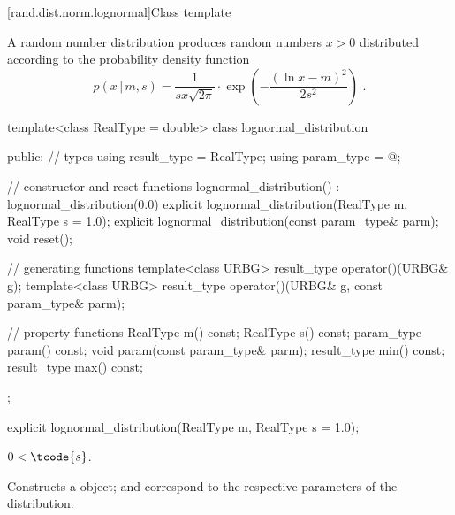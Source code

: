 
[rand.dist.norm.lognormal]{Class template }%
%
%

\pnum
A  random number distribution
produces random numbers $x > 0$
distributed according to
the probability density function%
%
%
\[ p(x\,|\,m,s) = \frac{1}{s x \sqrt{2 \pi}}
     \cdot \exp{\left(-\frac{(\ln{x} - m)^2}{2 s^2}\right)}
     \text{ .} \]

%
\begin{codeblock}
template<class RealType = double>
  class lognormal_distribution {
  public:
    // types
    using result_type = RealType;
    using param_type  = @\unspec@;

    // constructor and reset functions
    lognormal_distribution() : lognormal_distribution(0.0) {}
    explicit lognormal_distribution(RealType m, RealType s = 1.0);
    explicit lognormal_distribution(const param_type& parm);
    void reset();

    // generating functions
    template<class URBG>
      result_type operator()(URBG& g);
    template<class URBG>
      result_type operator()(URBG& g, const param_type& parm);

    // property functions
    RealType m() const;
    RealType s() const;
    param_type param() const;
    void param(const param_type& parm);
    result_type min() const;
    result_type max() const;
  };
\end{codeblock}


%
\begin{itemdecl}
explicit lognormal_distribution(RealType m, RealType s = 1.0);
\end{itemdecl}

\begin{itemdescr}
\pnum
\requires $0 < \tcode{s}$.

\pnum
\effects Constructs a  object;
 and 
correspond to the respective parameters of the distribution.
\end{itemdescr}

